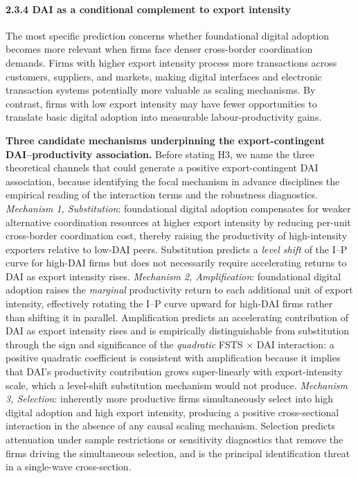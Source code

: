 \documentclass[
  12pt,a4paper]{article}
\begin{document}
\hypertarget{dai-as-a-conditional-complement-to-export-intensity}{%
\paragraph{2.3.4 DAI as a conditional complement to export
intensity}\label{dai-as-a-conditional-complement-to-export-intensity}}

The most specific prediction concerns whether foundational digital
adoption becomes more relevant when firms face denser cross-border
coordination demands. Firms with higher export intensity process more
transactions across customers, suppliers, and markets, making digital
interfaces and electronic transaction systems potentially more valuable
as scaling mechanisms. By contrast, firms with low export intensity may
have fewer opportunities to translate basic digital adoption into
measurable labour-productivity gains.

\textbf{Three candidate mechanisms underpinning the export-contingent
DAI--productivity association.} Before stating H3, we name the three
theoretical channels that could generate a positive export-contingent
DAI association, because identifying the focal mechanism in advance
disciplines the empirical reading of the interaction terms and the
robustness diagnostics. \emph{Mechanism 1, Substitution}: foundational
digital adoption compensates for weaker alternative coordination
resources at higher export intensity by reducing per-unit cross-border
coordination cost, thereby raising the productivity of high-intensity
exporters relative to low-DAI peers. Substitution predicts a \emph{level
shift} of the I--P curve for high-DAI firms but does not necessarily
require accelerating returns to DAI as export intensity rises.
\emph{Mechanism 2, Amplification}: foundational digital adoption raises
the \emph{marginal} productivity return to each additional unit of
export intensity, effectively rotating the I--P curve upward for
high-DAI firms rather than shifting it in parallel. Amplification
predicts an accelerating contribution of DAI as export intensity rises
and is empirically distinguishable from substitution through the sign
and significance of the \emph{quadratic} FSTS × DAI interaction: a
positive quadratic coefficient is consistent with amplification because
it implies that DAI's productivity contribution grows super-linearly
with export-intensity scale, which a level-shift substitution mechanism
would not produce. \emph{Mechanism 3, Selection}: inherently more
productive firms simultaneously select into high digital adoption and
high export intensity, producing a positive cross-sectional interaction
in the absence of any causal scaling mechanism. Selection predicts
attenuation under sample restrictions or sensitivity diagnostics that
remove the firms driving the simultaneous selection, and is the
principal identification threat in a single-wave cross-section.
\end{document}
